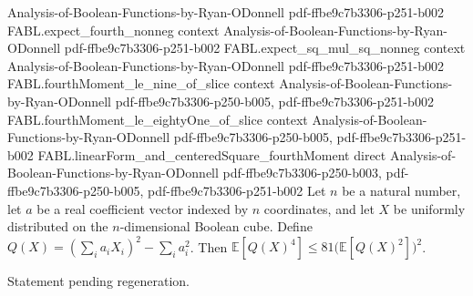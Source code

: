 \begin{theorem}
  {Analysis-of-Boolean-Functions-by-Ryan-ODonnell}
  {pdf-ffbe9c7b3306-p251-b002}
\proofstep
  {FABL.expect_fourth_nonneg}
  {context}
  {Analysis-of-Boolean-Functions-by-Ryan-ODonnell}
  {pdf-ffbe9c7b3306-p251-b002}
\proofstep
  {FABL.expect_sq_mul_sq_nonneg}
  {context}
  {Analysis-of-Boolean-Functions-by-Ryan-ODonnell}
  {pdf-ffbe9c7b3306-p251-b002}
\proofstep
  {FABL.fourthMoment_le_nine_of_slice}
  {context}
  {Analysis-of-Boolean-Functions-by-Ryan-ODonnell}
  {pdf-ffbe9c7b3306-p250-b005,
    pdf-ffbe9c7b3306-p251-b002}
\proofstep
  {FABL.fourthMoment_le_eightyOne_of_slice}
  {context}
  {Analysis-of-Boolean-Functions-by-Ryan-ODonnell}
  {pdf-ffbe9c7b3306-p250-b005,
    pdf-ffbe9c7b3306-p251-b002}
\proofstep
  {FABL.linearForm_and_centeredSquare_fourthMoment}
  {direct}
  {Analysis-of-Boolean-Functions-by-Ryan-ODonnell}
  {pdf-ffbe9c7b3306-p250-b003,
    pdf-ffbe9c7b3306-p250-b005,
    pdf-ffbe9c7b3306-p251-b002}
Let $n$ be a natural number, let $a$ be a real coefficient vector indexed by $n$
coordinates, and let $X$ be uniformly distributed on the $n$-dimensional Boolean cube.
Define $Q(X)=(\sum_i a_i X_i)^2-\sum_i a_i^2$. Then $\mathbb E[Q(X)^4]\le
81\bigl(\mathbb E[Q(X)^2]\bigr)^2$.
\end{theorem}

\begin{theorem}
\label{FABL.expect_linearForm_fourth}
\leanok
{}
Statement pending regeneration.
\end{theorem}

